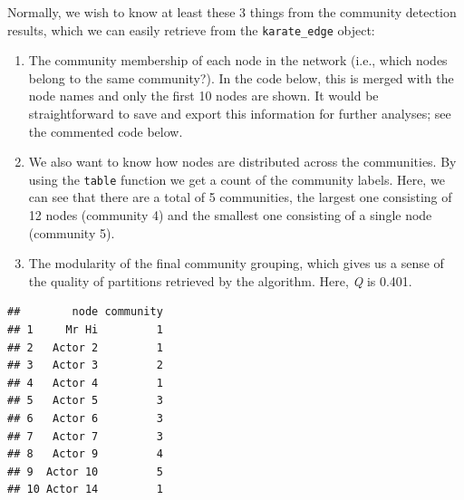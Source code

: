 \documentclass[
]{book}
\newenvironment{Shaded}{\begin{snugshade}}{\end{snugshade}}
\newcommand{\AttributeTok}[1]{\textcolor[rgb]{0.13,0.29,0.53}{#1}}
\newcommand{\CommentTok}[1]{\textcolor[rgb]{0.56,0.35,0.01}{\textit{#1}}}
\newcommand{\DecValTok}[1]{\textcolor[rgb]{0.00,0.00,0.81}{#1}}
\newcommand{\DocumentationTok}[1]{\textcolor[rgb]{0.56,0.35,0.01}{\textbf{\textit{#1}}}}
\newcommand{\FunctionTok}[1]{\textcolor[rgb]{0.13,0.29,0.53}{\textbf{#1}}}
\newcommand{\NormalTok}[1]{#1}
\newcommand{\SpecialCharTok}[1]{\textcolor[rgb]{0.81,0.36,0.00}{\textbf{#1}}}
\providecommand{\tightlist}{%
  \setlength{\itemsep}{0pt}\setlength{\parskip}{0pt}}
\begin{document}
Normally, we wish to know at least these 3 things from the community detection results, which we can easily retrieve from the \texttt{karate\_edge} object:

\begin{enumerate}
\def\labelenumi{\arabic{enumi}.}
\tightlist
\item
  The community membership of each node in the network (i.e., which nodes belong to the same community?). In the code below, this is merged with the node names and only the first 10 nodes are shown. It would be straightforward to save and export this information for further analyses; see the commented code below.
\item
  We also want to know how nodes are distributed across the communities. By using the \texttt{table} function we get a count of the community labels. Here, we can see that there are a total of 5 communities, the largest one consisting of 12 nodes (community 4) and the smallest one consisting of a single node (community 5).
\item
  The modularity of the final community grouping, which gives us a sense of the quality of partitions retrieved by the algorithm. Here, \emph{Q} is 0.401.
\end{enumerate}

\begin{Shaded}
\end{Shaded}

\begin{verbatim}
##        node community
## 1     Mr Hi         1
## 2   Actor 2         1
## 3   Actor 3         2
## 4   Actor 4         1
## 5   Actor 5         3
## 6   Actor 6         3
## 7   Actor 7         3
## 8   Actor 9         4
## 9  Actor 10         5
## 10 Actor 14         1
\end{verbatim}

\begin{Shaded}
\end{Shaded}
\end{document}

